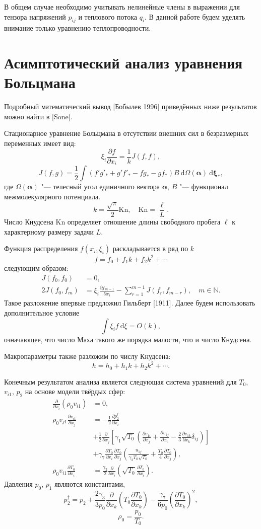 \documentclass[english,russian,a4paper,12pt]{article}
\newcommand{\Kn}{\mathrm{Kn}}
\newcommand{\dd}{\:\mathrm{d}}
\newcommand{\pder}[2][]{\frac{\partial#1}{\partial#2}}
\begin{document}
В общем случае необходимо учитывать нелинейные члены в выражении для тензора напряжений \(p_{ij}\) и теплового потока \(q_i\).
В данной работе будем уделять внимание только уравнению теплопроводности.

\section{Асимптотический анализ уравнения Больцмана}
Подробный математический вывод [Бобылев 1996] приведённых ниже результатов можно найти в [Sone].

Стационарное уравнение Больцмана в отсутствии внешних сил в безразмерных переменных имеет вид:
\begin{equation}\label{eq:Boltzmann}
	\xi_i\pder[f]{x_i} = \frac1k J(f,f),
\end{equation}
\begin{equation}\label{eq:integral}
	J(f,g) = \frac12 \int(f'g'_*+g'f'_*-fg_*-gf_*)B\dd\Omega(\boldsymbol\alpha)\dd \boldsymbol\xi_*,
\end{equation}
где \(\Omega(\boldsymbol{\alpha})\) "--- телесный угол единичного вектора \(\boldsymbol\alpha\),
\(B\) "--- функционал межмолекулярного потенциала.
\[ k = \frac{\sqrt\pi}2\Kn, \quad \Kn = \frac{\ell}L. \]
Число Кнудсена \(\Kn\) определяет отношение длины свободного пробега \(\ell\) к характерному размеру задачи \(L\).

Функция распределения \(f(x_i,\xi_i)\) раскладывается в ряд по \(k\)
\[ f = f_0 + f_1k + f_2k^2 + \cdots \]
следующим образом:
\begin{align*}
	J(f_0,f_0) &= 0, \\
	2J(f_0,f_m) &= \xi_i\pder[f_{m-1}]{x_i} - \sum\limits_{r=1}^{m-1}J(f_r,f_{m-r}), \quad m \in \mathbb{N}.
\end{align*}
Такое разложение впервые предложил Гильберт [1911]. Далее будем использовать дополнительное условие
\[ \int\xi_if\dd\xi = O(k), \]
означающее, что число Маха такого же порядка малости, что и число Кнудсена.

Макропараметры также разложим по числу Кнудсена:
\[ h = h_0 + h_1k + h_2k^2 + \cdots. \]

Конечным результатом анализа является следующая система уравнений для \(T_0\), \(v_{i1}\), \(p_2\)
на основе модели твёрдых сфер:
\begin{align*}
	\pder{x_i}(\rho_0v_{i1}) &= 0, \\
	\rho_0v_{j1}\pder[v_{i1}]{x_j} &= -\frac12\pder[p_2^\dag]{x_i} \\
		&+ \frac12\pder{x_j}\left[\gamma_1\sqrt{T_0}\left(\pder[v_{1i}]{x_j}+\pder[v_{1j}]{x_i}-\frac23\pder[v_{1k}]{x_k}\delta_{ij}\right)\right]\\
		&+ \gamma_7\pder[T_0]{x_i}\pder[T_0]{x_j}\left(\frac{u_{1j}}{\gamma_2T_0\sqrt{T_0}} + \frac{T_0}4\pder[T_0]{x_j} \right), \\
	\rho_0v_{i1}\pder[T_0]{x_i} &= \frac{\gamma_2}2\pder{x_i}\left(\sqrt{T_0}\pder[T_0]{x_i}\right).
\end{align*}
Давления \(p_0\), \(p_1\) являются константами,
\[ 
	p_2^\dag = p_2 + 
		\frac{2\gamma_3}{3p_0}\pder{x_k}\left(T_0\pder[T_0]{x_k}\right) -
		\frac{\gamma_7}{6p_0}\left(\pder[T_0]{x_k}\right)^2,
\]
\[ \rho_0 = \frac{p_0}{T_0}. \]
\end{document}
